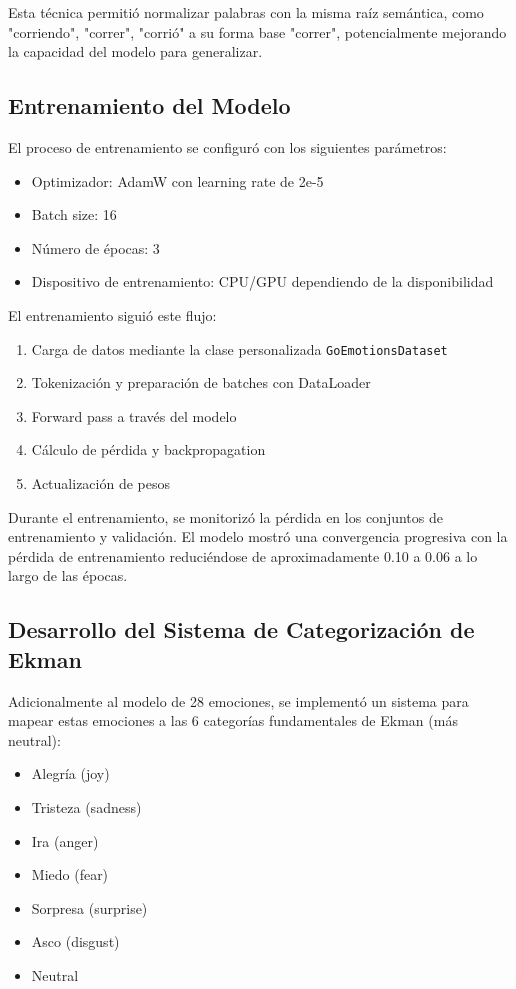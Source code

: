 \documentclass[12pt,a4paper]{report}
\begin{document}
Esta técnica permitió normalizar palabras con la misma raíz semántica, como "corriendo", "correr", "corrió" a su forma base "correr", potencialmente mejorando la capacidad del modelo para generalizar.

\subsection{Entrenamiento del Modelo}

El proceso de entrenamiento se configuró con los siguientes parámetros:
\begin{itemize}
  \item Optimizador: AdamW con learning rate de 2e-5
  \item Batch size: 16
  \item Número de épocas: 3
  \item Dispositivo de entrenamiento: CPU/GPU dependiendo de la disponibilidad
\end{itemize}

El entrenamiento siguió este flujo:
\begin{enumerate}
  \item Carga de datos mediante la clase personalizada \texttt{GoEmotionsDataset}
  \item Tokenización y preparación de batches con DataLoader
  \item Forward pass a través del modelo
  \item Cálculo de pérdida y backpropagation
  \item Actualización de pesos
\end{enumerate}

Durante el entrenamiento, se monitorizó la pérdida en los conjuntos de entrenamiento y validación. El modelo mostró una convergencia progresiva con la pérdida de entrenamiento reduciéndose de aproximadamente 0.10 a 0.06 a lo largo de las épocas.

\subsection{Desarrollo del Sistema de Categorización de Ekman}

Adicionalmente al modelo de 28 emociones, se implementó un sistema para mapear estas emociones a las 6 categorías fundamentales de Ekman (más neutral):
\begin{itemize}
  \item Alegría (joy)
  \item Tristeza (sadness)
  \item Ira (anger)
  \item Miedo (fear)
  \item Sorpresa (surprise)
  \item Asco (disgust)
  \item Neutral
\end{itemize}
\end{document}
